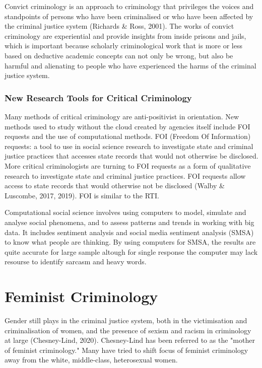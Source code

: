 \documentclass{article}
\begin{document}
Convict criminology is an approach to criminology that privileges the voices and standpoints of persons who have been criminalised or who have been affected by the criminal justice system (Richards \& Ross, 2001). The works of convict criminology are experiential and provide insights from inside prisons and jails, which is important because scholarly criminological work that is more or less based on deductive academic concepts can not only be wrong, but also be harmful and alienating to people who have experienced the harms of the criminal justice system.

\subsubsection*{New Research Tools for Critical Criminology}

Many methods of critical criminology are anti-positivist in orientation. New methods used to study without the cloud created by agencies itself include FOI requests and the use of computational methods. FOI (Freedom Of Information) requests: a tool to use in social science research to investigate state and criminal justice practices that accesses state records that would not otherwise be disclosed. More critical criminologists are turning to FOI requests as a form of qualitative research to investigate state and criminal justice practices. FOI requests allow access to state records that would otherwise not be disclosed (Walby \& Luscombe, 2017, 2019). FOI is similar to the RTI.

Computational social science involves using computers to model, simulate and analyse social phenomena, and to assess patterns and trends in working with big data. It includes sentiment analysis and social media sentiment analysis (SMSA) to know what people are thinking. By using computers for SMSA, the results are quite accurate for large sample altough for single response the computer may lack resourse to identify sarcasm and heavy words.

\section{Feminist Criminology}

Gender still plays in the criminal justice system, both in the victimisation and criminalisation of women, and the presence of sexism and racism in criminology at large (Chesney-Lind, 2020). Chesney-Lind has been referred to as the "mother of feminist criminology." Many have tried to shift focus of feminist criminology away from the white, middle-class, heterosexual women.
\end{document}
